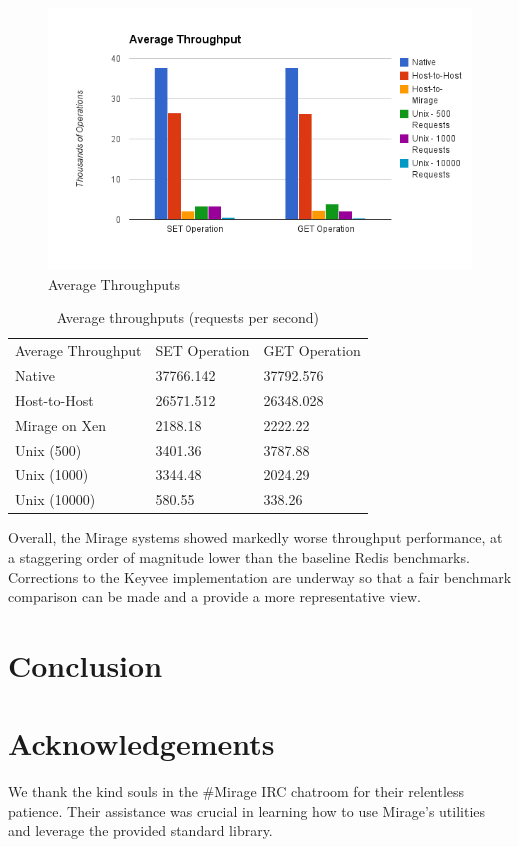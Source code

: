\documentclass[english,10pt,twocolumn]{article}
\begin{document}
\begin{figure}[ht]
  \centering
  \caption{Average Throughputs}
  \includegraphics[width=1.0\textwidth]{images/throughput}
\end{figure}

\begin{table}[h]
\begin{tabular}{lll}
Average Throughput & SET Operation & GET Operation \\
Native & 37766.142 & 37792.576 \\
Host-to-Host & 26571.512 & 26348.028 \\
Mirage on Xen & 2188.18 & 2222.22 \\
Unix (500) & 3401.36 & 3787.88 \\
Unix (1000) & 3344.48 & 2024.29 \\
Unix (10000) & 580.55 & 338.26
\end{tabular}
\caption{Average throughputs (requests per second)}
\label{my-label}
\end{table}

Overall, the Mirage systems showed markedly worse throughput performance, at a staggering order of magnitude lower than the baseline Redis benchmarks.
Corrections to the Keyvee implementation are underway so that a fair benchmark comparison can be made and a provide a more representative view.

\section{Conclusion}


\section{Acknowledgements}
We thank the kind souls in the \#Mirage IRC chatroom for their relentless patience.
Their assistance was crucial in learning how to use Mirage's utilities and leverage the provided standard library.





\end{document}

